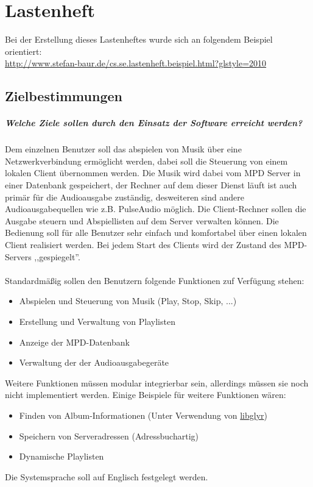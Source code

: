 \chapter{Lastenheft}
Bei der Erstellung dieses Lastenheftes wurde sich an folgendem Beispiel orientiert: \\
\url{http://www.stefan-baur.de/cs.se.lastenheft.beispiel.html?glstyle=2010}
\section{Zielbestimmungen}
\paragraph{Welche Ziele sollen durch den Einsatz der Software erreicht werden?}
Dem einzelnen Benutzer soll das abspielen von Musik über eine Netzwerkverbindung ermöglicht
werden, dabei soll die Steuerung von einem lokalen Client übernommen werden. 
Die Musik wird dabei vom MPD Server in einer Datenbank gespeichert, der Rechner auf dem dieser
Dienst läuft ist auch primär für die Audioausgabe zuständig, desweiteren sind andere Audioausgabequellen
wie z.B. PulseAudio möglich.
Die Client-Rechner sollen die Ausgabe steuern und Abspiellisten auf dem Server verwalten
können. Die Bedienung soll für alle Benutzer sehr einfach und komfortabel über einen lokalen
Client realisiert werden. Bei jedem Start des Clients wird der Zustand des MPD-Servers ,,gespiegelt''.
\\ \\
Standardmäßig sollen den Benutzern folgende Funktionen zuf Verfügung stehen:
\renewcommand{\labelitemi}{•}
\begin{itemize}
        \item Abspielen und Steuerung von Musik (Play, Stop, Skip, ...)
        \item Erstellung und Verwaltung von Playlisten
        \item Anzeige der MPD-Datenbank
        \item Verwaltung der der Audioausgabegeräte
\end{itemize}
Weitere Funktionen müssen modular integrierbar sein, allerdings müssen sie noch nicht implementiert
werden. Einige Beispiele für weitere Funktionen wären:
\begin{itemize}
    \item Finden von Album-Informationen (Unter Verwendung von \href{https://github.com/sahib/glyr}{libglyr})
	\item Speichern von Serveradressen (Adressbuchartig)
	\item Dynamische Playlisten
\end{itemize}
Die Systemsprache soll auf Englisch festgelegt werden.

